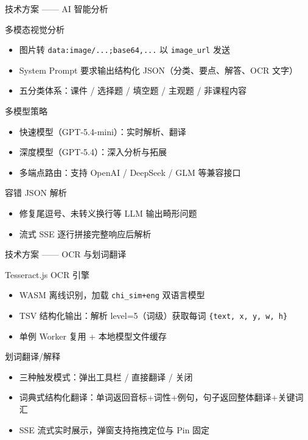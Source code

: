 \documentclass[aspectratio=169]{beamer}
\begin{document}
\begin{frame}{技术方案 —— AI 智能分析}
  \begin{block}{多模态视觉分析}
    \begin{itemize}
      \item 图片转 \texttt{data:image/...;base64,...} 以 \texttt{image\_url} 发送
      \item System Prompt 要求输出结构化 JSON（分类、要点、解答、OCR 文字）
      \item 五分类体系：课件 / 选择题 / 填空题 / 主观题 / 非课程内容
    \end{itemize}
  \end{block}

  \begin{block}{多模型策略}
    \begin{itemize}
      \item 快速模型（GPT-5.4-mini）：实时解析、翻译
      \item 深度模型（GPT-5.4）：深入分析与拓展
      \item 多端点路由：支持 OpenAI / DeepSeek / GLM 等兼容接口
    \end{itemize}
  \end{block}

  \begin{block}{容错 JSON 解析}
    \begin{itemize}
      \item 修复尾逗号、未转义换行等 LLM 输出畸形问题
      \item 流式 SSE 逐行拼接完整响应后解析
    \end{itemize}
  \end{block}
\end{frame}

\begin{frame}{技术方案 —— OCR 与划词翻译}
  \begin{block}{Tesseract.js OCR 引擎}
    \begin{itemize}
      \item WASM 离线识别，加载 \texttt{chi\_sim+eng} 双语言模型
      \item TSV 结构化输出：解析 level=5（词级）获取每词 \texttt{\{text, x, y, w, h\}}
      \item 单例 Worker 复用 + 本地模型文件缓存
    \end{itemize}
  \end{block}

  \begin{block}{划词翻译/解释}
    \begin{itemize}
      \item 三种触发模式：弹出工具栏 / 直接翻译 / 关闭
      \item 词典式结构化翻译：单词返回音标+词性+例句，句子返回整体翻译+关键词汇
      \item SSE 流式实时展示，弹窗支持拖拽定位与 Pin 固定
    \end{itemize}
  \end{block}
\end{frame}
\end{document}

